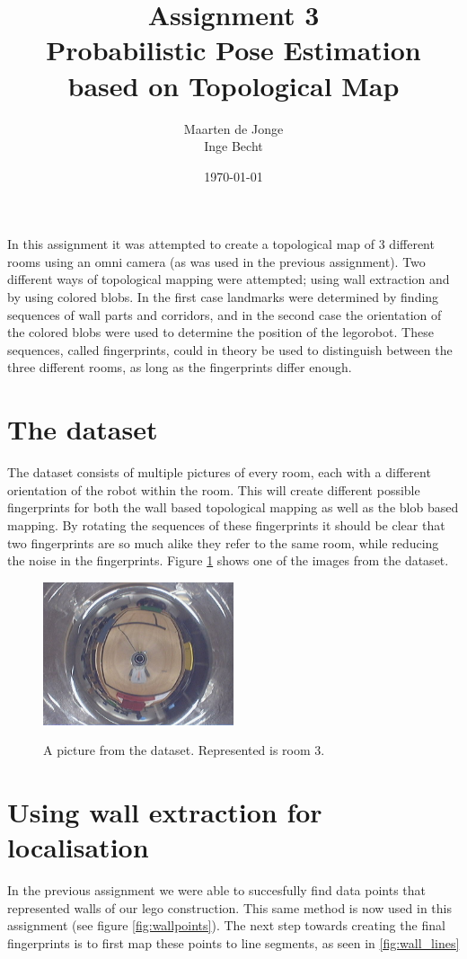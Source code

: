\documentclass[a4paper, 20pt]{article}
\author{Maarten de Jonge \\
    Inge Becht}
\date{\today}
\title{Assignment 3\\ 
Probabilistic Pose Estimation based on Topological Map}
\begin{document}
\maketitle

In this assignment it was attempted to create a topological map of 3 different
rooms using an omni camera (as was used in the previous assignment). Two
different ways of topological mapping were attempted; using wall extraction
and by using colored blobs. In the first case landmarks were determined by
finding sequences of wall parts and corridors, and in the second case the
orientation of the colored blobs were used to determine the position of the
legorobot.
These sequences, called fingerprints, could in theory be used to distinguish between
the three different rooms, as long as the fingerprints differ enough.

\section{The dataset} 
The dataset consists of multiple pictures of every room, each with a different
orientation of the robot within the room. This will create different possible
fingerprints for both the wall based topological mapping as well as the blob
based mapping. By rotating the sequences of these fingerprints it should be
clear that two fingerprints are so much alike they refer to the same room, while
reducing the noise in the fingerprints. Figure \ref{fig:exdata} shows one of the
images from the dataset.

\begin{figure}[!ht]
\centering
  \includegraphics[width=0.5\textwidth]{data_set/2012-11-26-121531.jpg}
  \label{fig:exdata}
  \caption{A picture from the dataset. Represented is room 3.} 
\end{figure}

\section{Using wall extraction for localisation}
In the previous assignment we were able to succesfully find data points that
represented walls of our lego construction. This same method is now used in this
assignment (see figure \ref{fig:wallpoints}). The next step towards creating the 
final fingerprints is to first  map these points to line segments, as seen in
\ref{fig:wall_lines}
\end{document}
